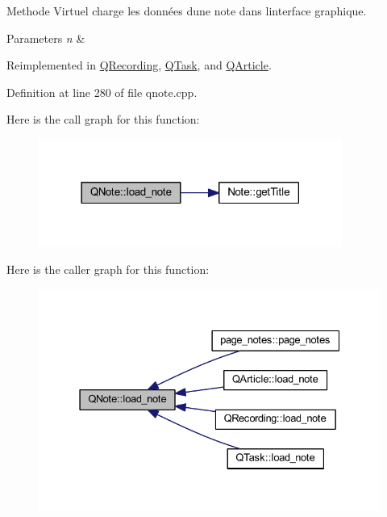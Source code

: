 Methode Virtuel charge les données d\textquotesingle{}une note dans l\textquotesingle{}interface graphique. 


\begin{DoxyParams}{Parameters}
{\em n} & \\
\hline
\end{DoxyParams}


Reimplemented in \hyperlink{class_q_recording_aa6984351b5a0bceaa63be793b160c73b}{Q\+Recording}, \hyperlink{class_q_task_a548fc51beaa1dcea345c362782aa11c0}{Q\+Task}, and \hyperlink{class_q_article_aea21c10581abe74709317283739e9552}{Q\+Article}.



Definition at line 280 of file qnote.\+cpp.

Here is the call graph for this function\+:\nopagebreak
\begin{figure}[H]
\begin{center}
\leavevmode
\includegraphics[width=282pt]{class_q_note_adca0a8f2851fbb1c3843ca4fe7957c11_cgraph}
\end{center}
\end{figure}
Here is the caller graph for this function\+:\nopagebreak
\begin{figure}[H]
\begin{center}
\leavevmode
\includegraphics[width=331pt]{class_q_note_adca0a8f2851fbb1c3843ca4fe7957c11_icgraph}
\end{center}
\end{figure}
\mbox{\label{class_q_note_ae6fb14b839acc1979b145a892d6a0a92}} 
